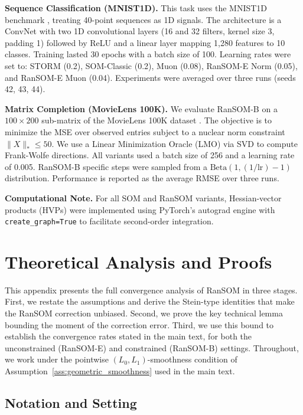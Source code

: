 \documentclass{article}
\theoremstyle{plain}
\theoremstyle{definition}
\theoremstyle{remark}
\begin{document}
\textbf{Sequence Classification (MNIST1D).} 
This task uses the MNIST1D benchmark \cite{mnist1d}, treating 40-point sequences as 1D signals. The architecture is a ConvNet with two 1D convolutional layers (16 and 32 filters, kernel size 3, padding 1) followed by ReLU and a linear layer mapping 1,280 features to 10 classes. Training lasted 30 epochs with a batch size of 100. Learning rates were set to: STORM (0.2), SOM-Classic (0.2), Muon (0.08), RanSOM-E Norm (0.05), and RanSOM-E Muon (0.04). Experiments were averaged over three runs (seeds 42, 43, 44).

\textbf{Matrix Completion (MovieLens 100K).} 
We evaluate RanSOM-B on a $100 \times 200$ sub-matrix of the MovieLens 100K dataset \cite{movielens}. The objective is to minimize the MSE over observed entries subject to a nuclear norm constraint $\|X\|_* \leq 50$. We use a Linear Minimization Oracle (LMO) via SVD to compute Frank-Wolfe directions. All variants used a batch size of 256 and a learning rate of 0.005. RanSOM-B specific steps were sampled from a $\text{Beta}(1, (1/\text{lr})-1)$ distribution. Performance is reported as the average RMSE over three runs.

\textbf{Computational Note.} For all SOM and RanSOM variants, Hessian-vector products (HVPs) were implemented using PyTorch’s autograd engine with \texttt{create\_graph=True} to facilitate second-order integration.

\section{Theoretical Analysis and Proofs}
\label{app:theory}

This appendix presents the full convergence analysis of RanSOM in three stages. First, we restate the assumptions and derive the Stein-type identities that make the RanSOM correction unbiased. Second, we prove the key technical lemma bounding the moment of the correction error. Third, we use this bound to establish the convergence rates stated in the main text, for both the unconstrained (RanSOM-E) and constrained (RanSOM-B) settings. Throughout, we work under the pointwise $(L_0, L_1)$-smoothness condition of Assumption~\ref{ass:geometric_smoothness} used in the main text.

\subsection{Notation and Setting}
\label{app:notation}
\end{document}
